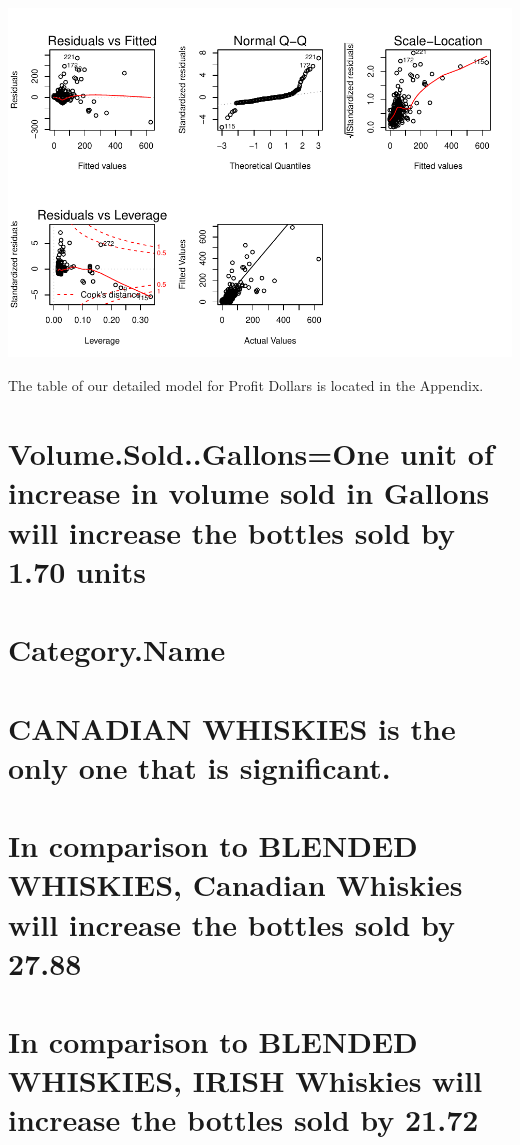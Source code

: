 \documentclass[]{elsarticle} %
\makeatletter
\def\maxwidth{\ifdim\Gin@nat@width>\linewidth\linewidth
\else\Gin@nat@width\fi}
\let\Oldincludegraphics\includegraphics
\renewcommand{\includegraphics}[1]{\Oldincludegraphics[width=\maxwidth]{#1}}
\makeatother
\begin{document}
\includegraphics{Final_Project_files/figure-latex/unnamed-chunk-19-1.pdf}

The table of our detailed model for Profit Dollars is located in the
Appendix.

\section{Volume.Sold..Gallons=One unit of increase in volume sold in
Gallons will increase the bottles sold by 1.70
units}\label{volume.sold..gallonsone-unit-of-increase-in-volume-sold-in-gallons-will-increase-the-bottles-sold-by-1.70-units}

\section{Category.Name}\label{category.name}

\section{CANADIAN WHISKIES is the only one that is
significant.}\label{canadian-whiskies-is-the-only-one-that-is-significant.}

\section{In comparison to BLENDED WHISKIES, Canadian Whiskies will
increase the bottles sold by
27.88}\label{in-comparison-to-blended-whiskies-canadian-whiskies-will-increase-the-bottles-sold-by-27.88}

\section{In comparison to BLENDED WHISKIES, IRISH Whiskies will increase
the bottles sold by
21.72}\label{in-comparison-to-blended-whiskies-irish-whiskies-will-increase-the-bottles-sold-by-21.72}
\end{document}
